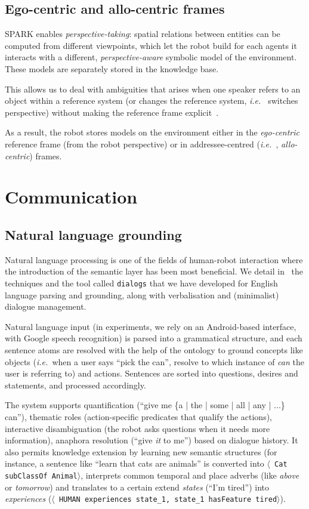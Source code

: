 \documentclass[letterpaper, 10 pt, conference]{ieeeconf}  %
\newcommand{\stmt}[1]{{\footnotesize \tt $\langle$ #1\relax$\rangle$}}
\newcommand{\ie}{{\textit{i.e.\ }}}
\begin{document}
\subsection{Ego-centric and allo-centric frames}

SPARK enables \emph{perspective-taking}: spatial relations between entities can
be computed from different viewpoints, which let the robot build for each
agents it interacts with a different, \emph{perspective-aware} symbolic model
of the environment. These models are separately stored in the knowledge base.

This allows us to deal with ambiguities that arises when one speaker refers to
an object within a reference system (or changes the reference system, \ie
switches perspective) without making the reference frame
explicit~\cite{Breazeal2006, Ros2010}.

As a result, the robot stores models on the environment either in the
\emph{ego-centric} reference frame (from the robot perspective) or in
addressee-centred (\ie, \emph{allo-centric}) frames.


\section{Communication}
\label{sect|com}

\subsection{Natural language grounding}

Natural language processing is one of the fields of human-robot interaction
where the introduction of the semantic layer has been most beneficial.
We detail in~\cite{Lemaignan2011a} the techniques and the tool called
\texttt{dialogs} that we have developed for English language parsing and
grounding, along with verbalisation and (minimalist) dialogue management.

Natural language input (in experiments, we rely on an Android-based interface,
with Google speech recognition) is parsed into a grammatical structure, and
each sentence atoms are resolved with the help of the ontology to ground
concepts like objects (\ie when a user says ``pick the can'', resolve to which
instance of \emph{can} the user is referring to) and actions. Sentences are
sorted into questions, desires and statements, and processed accordingly.

The system supports quantification (``give me \{a | the | some | all | any | ...\} can''),
thematic roles (action-specific predicates that qualify the actions), interactive disambiguation (the robot asks
questions when it needs more information), anaphora resolution (``give \emph{it} to me'') based on
dialogue history. It also permits knowledge extension by learning new semantic
structures (for instance, a sentence like ``learn that cats are animals'' is
converted into \stmt{Cat subClassOf Animal}, interprets common temporal and place adverbs (like \emph{above} or \emph{tomorrow}) and translates to a certain extend \emph{states} (``I'm tired'') into
\emph{experiences} (\stmt{HUMAN experiences state\_1, state\_1 hasFeature
tired}).
\end{document}
